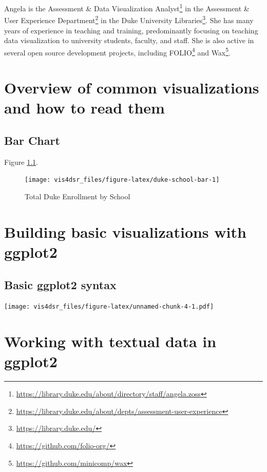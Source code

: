 \documentclass[
]{krantz}
\renewcommand{\href}[2]{#2\footnote{\url{#1}}}
\begin{document}
Angela is the \href{https://library.duke.edu/about/directory/staff/angela.zoss}{Assessment \& Data Visualization Analyst} in the \href{https://library.duke.edu/about/depts/assessment-user-experience}{Assessment \& User Experience Department} in the \href{https://library.duke.edu/}{Duke University Libraries}. She has many years of experience in teaching and training, predominantly focusing on teaching data visualization to university students, faculty, and staff. She is also active in several open source development projects, including \href{https://github.com/folio-org/}{FOLIO} and \href{https://github.com/minicomp/wax}{Wax}.

\mainmatter

\hypertarget{reading-visualizations}{%
\chapter{Overview of common visualizations and how to read them}\label{reading-visualizations}}

\hypertarget{bar-chart}{%
\section{Bar Chart}\label{bar-chart}}

Figure \ref{fig:duke-school-bar}.

\begin{figure}
\texttt{[image: vis4dsr\_files/figure-latex/duke-school-bar-1]} \caption{Total Duke Enrollment by School}\label{fig:duke-school-bar}
\end{figure}

\hypertarget{building-basic-visualizations}{%
\chapter{Building basic visualizations with ggplot2}\label{building-basic-visualizations}}

\hypertarget{basic-ggplot2-syntax}{%
\section{Basic ggplot2 syntax}\label{basic-ggplot2-syntax}}

\texttt{[image: vis4dsr\_files/figure-latex/unnamed-chunk-4-1.pdf]}

\hypertarget{text-data-visualizations}{%
\chapter{Working with textual data in ggplot2}\label{text-data-visualizations}}
\end{document}
